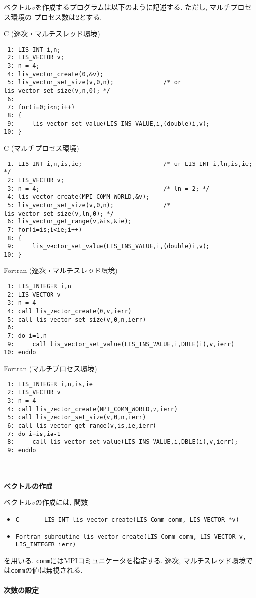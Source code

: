 \documentclass[a4paper]{jarticle}
\begin{document}
{{ベクトル$v$を作成するプログラムは以下のように記述する. ただし, マルチプロセス環境の
プロセス数は$2$とする. 
\begin{itembox}[l]{C (逐次・マルチスレッド環境)}
\small
\begin{verbatim}
 1: LIS_INT i,n;
 2: LIS_VECTOR v;
 3: n = 4;
 4: lis_vector_create(0,&v);
 5: lis_vector_set_size(v,0,n);              /* or lis_vector_set_size(v,n,0); */ 
 6:
 7: for(i=0;i<n;i++)
 8: {
 9:     lis_vector_set_value(LIS_INS_VALUE,i,(double)i,v);
10: }
\end{verbatim}
\end{itembox}
\begin{itembox}[l]{C (マルチプロセス環境)}
\small
\begin{verbatim}
 1: LIS_INT i,n,is,ie;                       /* or LIS_INT i,ln,is,ie; */
 2: LIS_VECTOR v;
 3: n = 4;                                   /* ln = 2; */
 4: lis_vector_create(MPI_COMM_WORLD,&v);
 5: lis_vector_set_size(v,0,n);              /* lis_vector_set_size(v,ln,0); */
 6: lis_vector_get_range(v,&is,&ie);
 7: for(i=is;i<ie;i++)
 8: {
 9:     lis_vector_set_value(LIS_INS_VALUE,i,(double)i,v);
10: }
\end{verbatim}
\end{itembox}
\begin{itembox}[l]{Fortran (逐次・マルチスレッド環境)}
\small
\begin{verbatim}
 1: LIS_INTEGER i,n
 2: LIS_VECTOR v
 3: n = 4
 4: call lis_vector_create(0,v,ierr)
 5: call lis_vector_set_size(v,0,n,ierr)  
 6:
 7: do i=1,n
 9:     call lis_vector_set_value(LIS_INS_VALUE,i,DBLE(i),v,ierr)
10: enddo
\end{verbatim}
\end{itembox}
\begin{itembox}[l]{Fortran (マルチプロセス環境)}
\small
\begin{verbatim}
 1: LIS_INTEGER i,n,is,ie                 
 2: LIS_VECTOR v
 3: n = 4                                   
 4: call lis_vector_create(MPI_COMM_WORLD,v,ierr)
 5: call lis_vector_set_size(v,0,n,ierr)              
 6: call lis_vector_get_range(v,is,ie,ierr)
 7: do i=is,ie-1
 8:     call lis_vector_set_value(LIS_INS_VALUE,i,DBLE(i),v,ierr);
 9: enddo
\end{verbatim}
\end{itembox}
\\ \\
\noindent
{\bf ベクトルの作成}

ベクトル$v$の作成には, 関数
\begin{itemize}
\item \verb|C       LIS_INT lis_vector_create(LIS_Comm comm, LIS_VECTOR *v)|
\item \verb|Fortran subroutine lis_vector_create(LIS_Comm comm, LIS_VECTOR v, LIS_INTEGER ierr)|
\end{itemize}
を用いる. 
{\tt comm}にはMPIコミュニケータを指定する. 逐次, マルチスレッド環境では{\tt comm}の値は無視される. 
\\ \\
\noindent
{\bf 次数の設定}

}}
\end{document}
